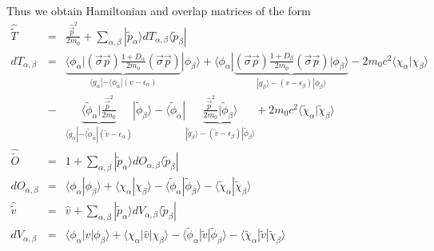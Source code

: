 \documentclass[11pt,a4paper]{report}
\begin{document}
Thus we obtain Hamiltonian and overlap matrices of the form
\begin{eqnarray}
\hat{\tilde{T}}&=&
\frac{\hat{\vec{p}}^2}{2m_0}
+\sum_{\alpha,\beta}|\tilde{p}_\alpha\rangle 
dT_{\alpha,\beta}\langle\tilde{p}_\beta|
\nonumber\\
dT_{\alpha,\beta}&=&
\underbrace{
\langle\phi_\alpha|
(\vec{\sigma}\vec{p})\frac{1+D_\alpha}{2m_0}(\vec{\sigma}\vec{p})
}_{\langle g_\alpha|-\langle\phi_\alpha|(v-\epsilon_\alpha)}
|\phi_\beta\rangle
+\langle\phi_\alpha|
\underbrace{(\vec{\sigma}\vec{p})\frac{1+D_\beta}{2m_0}(\vec{\sigma}\vec{p})
|\phi_\beta\rangle}_{|g_\beta\rangle-(v-\epsilon_\beta)|\phi_\beta\rangle}
-2m_0c^2\langle\chi_\alpha|\chi_\beta\rangle
\nonumber\\
&-&
\underbrace{
\langle\tilde{\phi}_\alpha|\frac{\hat{\vec{p}}^2}{2m_0}
}_{\langle \tilde{g}_\alpha|-\langle\tilde{\phi}_\alpha|(\tilde{v}-\epsilon_\alpha)}
|\tilde{\phi}_\beta\rangle
-\langle\tilde{\phi}_\alpha|
\underbrace{
\frac{\hat{\vec{p}}^2}{2m_0}|\tilde{\phi}_\beta\rangle
}_{|\tilde{g}_\beta\rangle-(\tilde{v}-\epsilon_\beta)|\tilde{\phi}_\beta\rangle}
+2m_0c^2\langle\tilde{\chi}_\alpha|\tilde{\chi}_\beta\rangle
\nonumber\\
\hat{\tilde{O}}&=&1+
\sum_{\alpha,\beta}|\tilde{p}_\alpha\rangle dO_{\alpha,\beta}\langle\tilde{p}_\beta|
\nonumber\\
dO_{\alpha,\beta}&=&
\langle\phi_\alpha|\phi_\beta\rangle+\langle\chi_\alpha|\chi_\beta\rangle
-\langle\tilde{\phi}_\alpha|\tilde{\phi}_\beta\rangle
-\langle\tilde{\chi}_\alpha|\tilde{\chi}_\beta\rangle
\nonumber\\
\hat{\tilde{v}}&=&\hat{v}+
\sum_{\alpha,\beta}|\tilde{p}_\alpha\rangle dV_{\alpha,\beta}\langle\tilde{p}_\beta|
\nonumber\\
dV_{\alpha,\beta}&=&
\langle\phi_\alpha|\hat{v}|\phi_\beta\rangle
+\langle\chi_\alpha|\hat{v}|\chi_\beta\rangle
-\langle\tilde{\phi}_\alpha|\tilde{v}|\tilde{\phi}_\beta\rangle
-\langle\tilde{\chi}_\alpha|\tilde{v}|\tilde{\chi}_\beta\rangle
\end{eqnarray}

\end{document}
